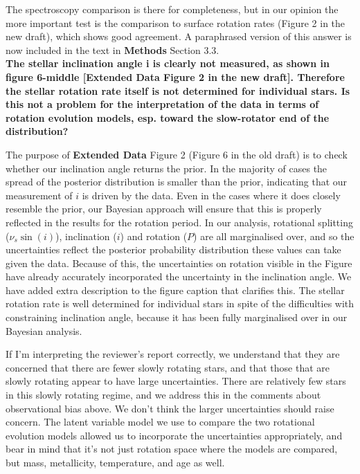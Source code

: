 \documentclass[11pt]{article}
\begin{document}
The spectroscopy comparison is there for completeness, but in our opinion the more important test is the comparison to surface rotation rates (Figure 2 in the new draft), which shows good agreement. A paraphrased version of this answer is now included in the text in \textbf{Methods} Section 3.3.\\

\noindent \textbf{The stellar inclination angle i is clearly not measured, as shown in figure 6-middle [\textbf{Extended Data} Figure 2 in the new draft]. Therefore the stellar rotation rate itself is not determined for individual stars. Is this not a problem for the interpretation of the data in terms of rotation evolution models, esp. toward the slow-rotator end of the distribution?}

The purpose of \textbf{Extended Data} Figure 2 (Figure 6 in the old draft) is to check whether our inclination angle returns the prior. In the majority of cases the spread of the posterior distribution is smaller than the prior, indicating that our measurement of $i$ is driven by the data. Even in the cases where it does closely resemble the prior, our Bayesian approach will ensure that this is properly reflected in the results for the rotation period. In our analysis, rotational splitting ($\nu_{s}\sin(i)$), inclination ($i$) and rotation ($P$) are all marginalised over, and so the uncertainties reflect the posterior probability distribution these values can take given the data. Because of this, the uncertainties on rotation visible in the Figure have already accurately incorporated the uncertainty in the inclination angle. We have added extra description to the figure caption that clarifies this. The stellar rotation rate is well determined for individual stars in spite of the difficulties with constraining inclination angle, because it has been fully marginalised over in our Bayesian analysis.

If I’m interpreting the reviewer’s report correctly, we understand that they are concerned that there are fewer slowly rotating stars, and that those that are slowly rotating appear to have large uncertainties. There are relatively few stars in this slowly rotating regime, and we address this in the comments about observational bias above. We don’t think the larger uncertainties should raise concern. The latent variable model we use to compare the two rotational evolution models allowed us to incorporate the uncertainties appropriately, and bear in mind that it’s not just rotation space where the models are compared, but mass, metallicity, temperature, and age as well.\\
\end{document}
